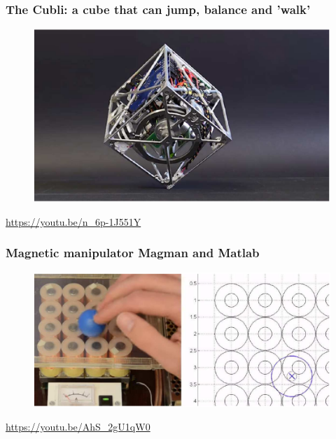\begin{frame}
	\frametitle{The Cubli: a cube that can jump, balance and 'walk'}
	\begin{figure}
		\includegraphics[scale=.55]{cubli}
	\end{figure}
	\url{https://youtu.be/n_6p-1J551Y}
\end{frame}

\begin{frame}
	\frametitle{Magnetic manipulator Magman and Matlab}
	\begin{figure}
		\includegraphics[scale=.65]{magnetic_manipulator}
	\end{figure}
	\url{https://youtu.be/AhS_2gU1qW0}
\end{frame}

